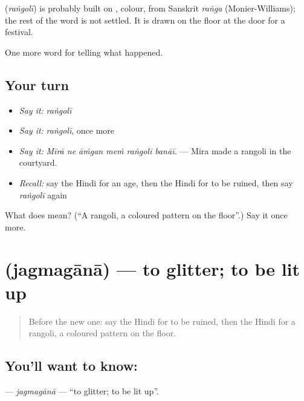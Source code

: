 \begin{cousinweb}
\textbf{} (\emph{raṅgolī}) is probably built on \textbf{}, colour, from Sanskrit \emph{raṅga} (Monier-Williams); the rest of the word is not settled. It is drawn on the floor at the door for a festival.
\end{cousinweb}

\begin{grammarlens}[title={What you've built}]
One more word for telling what happened.
\end{grammarlens}

\subsection*{Your turn}
\begin{itemize}
\raggedright
  \item \emph{Say it:} \emph{raṅgolī}
  \item \emph{Say it:} \emph{raṅgolī}, once more
  \item \emph{Say it:} \emph{Mīrā ne āṁgan meṁ raṅgolī banāī.} — Mira made a rangoli in the courtyard.
  \item \emph{Recall:} say the Hindi for an age, then the Hindi for to be ruined, then say \emph{raṅgolī} again
\end{itemize}

\begin{tcolorbox}[breakable,colback=teal!4,colframe=teal!35!black,title={Before you move on}]
What does  mean? (\textquotedblleft{}A rangoli, a coloured pattern on the floor\textquotedblright{}.) Say it once more.
\end{tcolorbox}
\section[\texorpdfstring{\hi{जगमगाना} (jagmagānā)}{जगमगाना (jagmagānā)}]{ (jagmagānā) — to glitter; to be lit up}

\label{lesson:HI-C328-jagmagana}



\begin{quote}
Before the new one: say the Hindi for to be ruined, then the Hindi for a rangoli, a coloured pattern on the floor.
\end{quote}

\subsection*{You'll want to know: }
\textbf{} — \emph{jagmagānā} — \textquotedblleft{}to glitter; to be lit up\textquotedblright{}.

